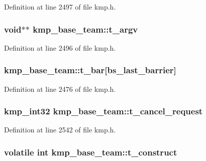 Definition at line 2497 of file kmp.\-h.

\hypertarget{structkmp__base__team_a3c73e14c4ca69f5ffc8b8f07d22eca8f}{
\subsubsection[{t\-\_\-argv}]{ {\bf void}$\ast$$\ast$ kmp\-\_\-base\-\_\-team\-::t\-\_\-argv}}\label{structkmp__base__team_a3c73e14c4ca69f5ffc8b8f07d22eca8f}


Definition at line 2496 of file kmp.\-h.

\hypertarget{structkmp__base__team_aa0629d5b774ba2afbb9bae995f48fb59}{
\subsubsection[{t\-\_\-bar}]{ kmp\-\_\-base\-\_\-team\-::t\-\_\-bar\mbox{[}{\bf bs\-\_\-last\-\_\-barrier}\mbox{]}}}\label{structkmp__base__team_aa0629d5b774ba2afbb9bae995f48fb59}


Definition at line 2476 of file kmp.\-h.

\hypertarget{structkmp__base__team_a30ed1abd475e0ed6fd7d233322289680}{
\subsubsection[{t\-\_\-cancel\-\_\-request}]{\setlength{\rightskip}{0pt plus 5cm}kmp\-\_\-int32 kmp\-\_\-base\-\_\-team\-::t\-\_\-cancel\-\_\-request}}\label{structkmp__base__team_a30ed1abd475e0ed6fd7d233322289680}


Definition at line 2542 of file kmp.\-h.

\hypertarget{structkmp__base__team_ad132b580c5fdcc46130bafb56c527e25}{
\subsubsection[{t\-\_\-construct}]{\setlength{\rightskip}{0pt plus 5cm}volatile {\bf int} kmp\-\_\-base\-\_\-team\-::t\-\_\-construct}}\label{structkmp__base__team_ad132b580c5fdcc46130bafb56c527e25}


